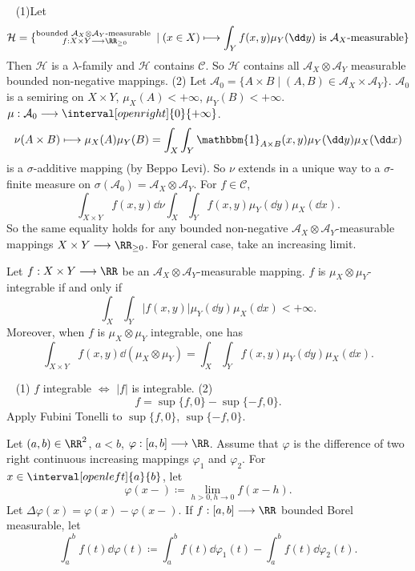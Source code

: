 \begin{proofenv}
    \ \newline
    (1)Let
    $$\mathcal{H}=\{\substack{\text{bounded }\mathcal{A}_{X}\otimes \mathcal{A}_{Y}\text{-measurable }\\ f:X\times Y\longrightarrow \RR_{\ge 0}}\mid (x\in X)\longmapsto \int_{Y} f(x,y)\mu_Y(\dd y) \text{ is }\mathcal{A}_X\text{-measurable}\}$$
    Then $\mathcal{H}$ is a $\lambda$-family and $\mathcal{H}$ contains $\mathcal{C}$.
    So $\mathcal{H}$ contains all $\mathcal{A}_X\otimes \mathcal{A}_Y$ measurable bounded non-negative mappings.
    \newline
    (2) Let $\mathcal{A}_0=\{A\times B\mid (A,B)\in \mathcal{A}_X\times \mathcal{A}_Y\}$. $\mathcal{A}_0$ is a semiring on $X\times Y$, $\mu_X(A)<+\infty$, $\mu_Y(B)<+\infty$. $\mu: \mathcal{A}_0\longrightarrow \interval[open right]{0}{+\infty}$.
    $$ \nu(A\times B)\longmapsto \mu_X(A)\mu_Y(B)=\int_X\int_{Y} \mathbbm{1}_{A\times B}(x,y)\mu_{Y}(\dd y)\mu_X(\dd x)$$
    is a $\sigma$-additive mapping (by Beppo Levi).
    So $\nu$ extends in a unique way to a $\sigma$-finite measure on $\sigma(\mathcal{A}_0)=\mathcal{A}_X\otimes \mathcal{A}_Y$. 
    For $f\in \mathcal{C}$,
    $$ \int_{X\times Y} f(x,y)\dd \nu \int_{X}\int_{Y}f(x,y)\mu_Y(\dd y)\mu_{X}(\dd x).$$
    So the same equality holds for any bounded non-negative $\mathcal{A}_X\otimes \mathcal{A}_Y$-measurable mappings $X\times Y\longrightarrow \RR_{\ge 0}$.
    For general case, take an increasing limit.
\end{proofenv}
\begin{theoremenv}[Fubini]
    Let $f:X\times Y\longrightarrow \RR$  be an $\mathcal{A}_X\otimes \mathcal{A}_Y$-measurable mapping. $f$ is $\mu_X\otimes \mu_Y$-integrable if and only if
    $$ \int_X\int_{Y}|f(x,y)|\mu_Y(\dd y)\mu_X(\dd  x)<+\infty.$$
    Moreover, when $f$ is $\mu_X\otimes \mu_Y$ integrable, one has
    $$ \int_{X\times Y} f(x,y)\dd (\mu_X\otimes \mu_Y)=\int_{X}\int_{Y} f(x,y)\mu_{Y}(\dd y)\mu_{X}(\dd x).$$
\end{theoremenv}
\begin{proofenv}
    \ \newline
    (1) $f$ integrable $\Leftrightarrow$ $|f|$ is integrable.
    \newline
    (2) $$ f=\sup\{f,0\}-\sup\{-f,0\}.$$
    Apply Fubini Tonelli to $\sup\{f,0\}$, $\sup\{-f,0\}$.
\end{proofenv}
\begin{definitionenv}
    Let $(a,b)\in \RR^2$, $a<b$, $\varphi:[a,b]\longrightarrow \RR$. Assume that $\varphi$ is the difference of two right continuous increasing mappings $\varphi_1$ and $\varphi_2$.
    For $x\in \interval[open left]{a}{b}$, let
    $$\varphi(x-)\coloneq \lim_{h>0,h\rightarrow 0} f(x-h).$$
    Let $\Delta \varphi(x)=\varphi(x)-\varphi(x-)$.
    If $f:[a,b]\longrightarrow \RR$ bounded Borel measurable, let 
    $$ \int_{a}^{b}f(t)\dd \varphi (t) \coloneq \int_{a}^{b} f(t)\dd \varphi_1(t) -\int_{a}^{b} f(t) \dd\varphi_2(t).$$
\end{definitionenv}
